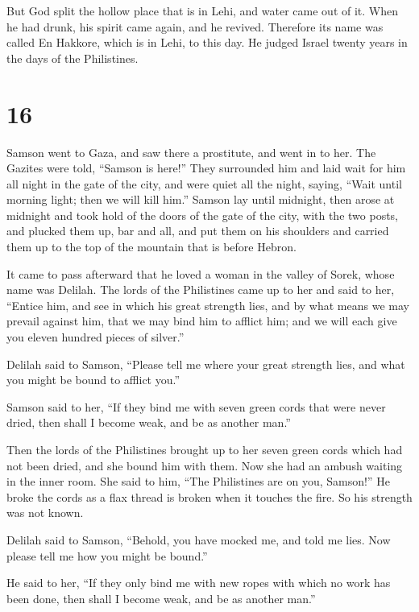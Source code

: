  But God split the hollow place that is in Lehi, and
water came out of it. When he had drunk, his spirit came again, and he
revived. Therefore its name was called En Hakkore, which is in Lehi, to
this day.  He judged Israel twenty years in the days of
the Philistines.

\hypertarget{section-15}{%
\section{16}\label{section-15}}

 Samson went to Gaza, and saw there a prostitute, and went
in to her.  The Gazites were told, ``Samson is here!''
They surrounded him and laid wait for him all night in the gate of the
city, and were quiet all the night, saying, ``Wait until morning light;
then we will kill him.''  Samson lay until midnight, then
arose at midnight and took hold of the doors of the gate of the city,
with the two posts, and plucked them up, bar and all, and put them on
his shoulders and carried them up to the top of the mountain that is
before Hebron.

 It came to pass afterward that he loved a woman in the
valley of Sorek, whose name was Delilah.  The lords of the
Philistines came up to her and said to her, ``Entice him, and see in
which his great strength lies, and by what means we may prevail against
him, that we may bind him to afflict him; and we will each give you
eleven hundred pieces of silver.''

 Delilah said to Samson, ``Please tell me where your great
strength lies, and what you might be bound to afflict you.''

 Samson said to her, ``If they bind me with seven green
cords that were never dried, then shall I become weak, and be as another
man.''

 Then the lords of the Philistines brought up to her seven
green cords which had not been dried, and she bound him with them.
 Now she had an ambush waiting in the inner room. She said
to him, ``The Philistines are on you, Samson!'' He broke the cords as a
flax thread is broken when it touches the fire. So his strength was not
known.

 Delilah said to Samson, ``Behold, you have mocked me,
and told me lies. Now please tell me how you might be bound.''

 He said to her, ``If they only bind me with new ropes
with which no work has been done, then shall I become weak, and be as
another man.''

